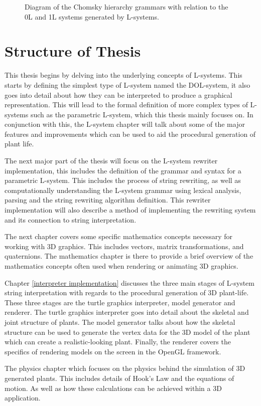 \begin{figure}[htbp]
	{\centering
		\setlength{\fboxrule}{1pt}
		\vspace{7px}
		\caption{Diagram of the Chomsky hierarchy grammars with relation to the 0L and 1L systems generated by L-systems.} \label{chomsky grammars}
	}
\end{figure}
\FloatBarrier

\section{Structure of Thesis}

This thesis begins by delving into the underlying concepts of L-systems. This starts by defining the simplest type of L-system named the DOL-system, it also goes into detail about how they can be interpreted to produce a graphical representation. This will lead to the formal definition of more complex types of L-systems such as the parametric L-system, which this thesis mainly focuses on. In conjunction with this, the L-system chapter will talk about some of the major features and improvements which can be used to aid the procedural generation of plant life. 

The next major part of the thesis will focus on the L-system rewriter implementation, this includes the definition of the grammar and syntax for a parametric L-system. This includes the process of string rewriting, as well as computationally understanding the L-system grammar using lexical analysis, parsing and the string rewriting algorithm definition. This rewriter implementation will also describe a method of implementing the rewriting system and its connection to string interpretation.

The next chapter covers some specific mathematics concepts necessary for working with 3D graphics. This includes vectors, matrix transformations, and quaternions. The mathematics chapter is there to provide a brief overview of the mathematics concepts often used when rendering or animating 3D graphics.  

Chapter \ref{interpreter implementation} discusses the three main stages of L-system string interpretation with regards to the procedural generation of 3D plant-life. These three stages are the turtle graphics interpreter, model generator and renderer. The turtle graphics interpreter goes into detail about the skeletal and joint structure of plants. The model generator talks about how the skeletal structure can be used to generate the vertex data for the 3D model of the plant which can create a realistic-looking plant. Finally, the renderer covers the specifics of rendering models on the screen in the OpenGL framework.

The physics chapter which focuses on the physics behind the simulation of 3D generated plants. This includes details of Hook's Law and the equations of motion. As well as how these calculations can be achieved within a 3D application.



